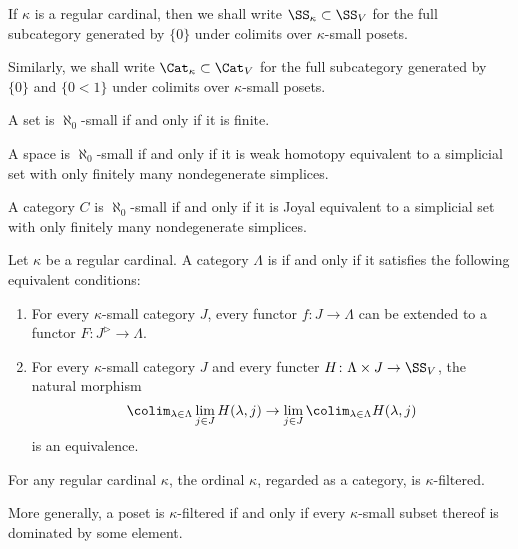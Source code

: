 \begin{definition}
	If $ \kappa $ is a regular cardinal,
	then we shall write $ \SS_{\kappa} \subset \SS_V $
	for the full subcategory generated by $ \{ 0 \} $
	under colimits over $ \kappa $-small posets.

	Similarly, we shall write $ \Cat_{\kappa} \subset \Cat_V $
	for the full subcategory generated 
	by $ \{ 0 \} $ and $ \{ 0 < 1 \} $
	under colimits over $ \kappa $-small posets.
\end{definition}

\begin{eg}
	A set is $ \aleph_0 $-small if and only if it is finite.

	A space is $ \aleph_0 $-small if and only if
	it is weak homotopy equivalent to a simplicial set
	with only finitely many nondegenerate simplices.

	A category $ C $ is $ \aleph_0 $-small if and only if
	it is Joyal equivalent to a simplicial set
	with only finitely many nondegenerate simplices. 
\end{eg}

\begin{definition}
	Let $ \kappa $ be a regular cardinal.
	A category $ \Lambda $ is  if and only if
	it satisfies the following equivalent conditions:
	\begin{enumerate}
		\item For every $ \kappa $-small category $ J $,
			every functor $ f \colon J \to \Lambda $ can be extended
			to a functor $ F \colon J^{\rhd} \to \Lambda $.
		\item For every $ \kappa $-small category $ J $
			and every functer $ H \colon \Lambda \times J \to \SS_V$,
			the natural morphism
			\[
				\colim_{\lambda \in \Lambda} \lim_{j \in J} H(\lambda,j)
				\to
				\lim_{j \in J} \colim_{\lambda \in \Lambda} H(\lambda,j)
			\]
			is an equivalence.
	\end{enumerate}
\end{definition}

\begin{eg}
	For any regular cardinal $ \kappa $,
	the ordinal $ \kappa $, regarded as a category,
	is $ \kappa $-filtered.

	More generally, a poset is $ \kappa $-filtered if and only if
	every $ \kappa $-small subset thereof is dominated by some element.
\end{eg}

